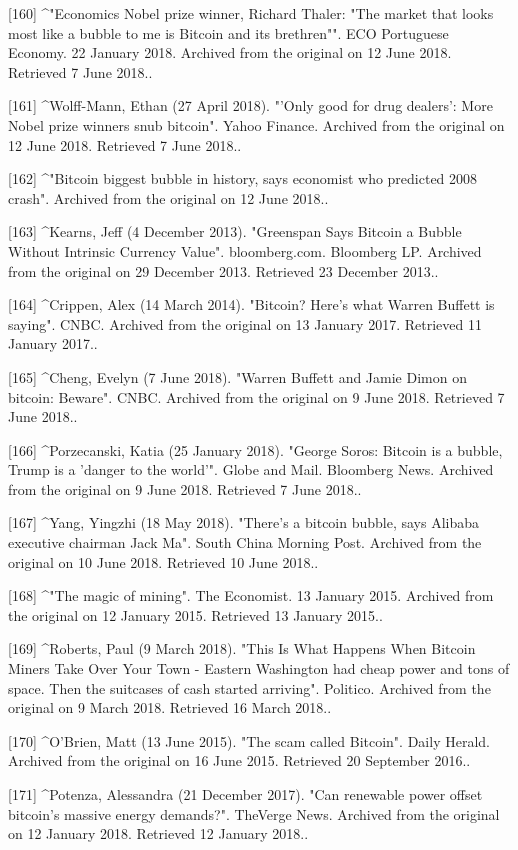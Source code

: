 [160]
^"Economics Nobel prize winner, Richard Thaler: "The market that looks most like a bubble to me is Bitcoin and its brethren"". ECO Portuguese Economy. 22 January 2018. Archived from the original on 12 June 2018. Retrieved 7 June 2018..

[161]
^Wolff-Mann, Ethan (27 April 2018). "'Only good for drug dealers': More Nobel prize winners snub bitcoin". Yahoo Finance. Archived from the original on 12 June 2018. Retrieved 7 June 2018..

[162]
^"Bitcoin biggest bubble in history, says economist who predicted 2008 crash". Archived from the original on 12 June 2018..

[163]
^Kearns, Jeff (4 December 2013). "Greenspan Says Bitcoin a Bubble Without Intrinsic Currency Value". bloomberg.com. Bloomberg LP. Archived from the original on 29 December 2013. Retrieved 23 December 2013..

[164]
^Crippen, Alex (14 March 2014). "Bitcoin? Here's what Warren Buffett is saying". CNBC. Archived from the original on 13 January 2017. Retrieved 11 January 2017..

[165]
^Cheng, Evelyn (7 June 2018). "Warren Buffett and Jamie Dimon on bitcoin: Beware". CNBC. Archived from the original on 9 June 2018. Retrieved 7 June 2018..

[166]
^Porzecanski, Katia (25 January 2018). "George Soros: Bitcoin is a bubble, Trump is a 'danger to the world'". Globe and Mail. Bloomberg News. Archived from the original on 9 June 2018. Retrieved 7 June 2018..

[167]
^Yang, Yingzhi (18 May 2018). "There's a bitcoin bubble, says Alibaba executive chairman Jack Ma". South China Morning Post. Archived from the original on 10 June 2018. Retrieved 10 June 2018..

[168]
^"The magic of mining". The Economist. 13 January 2015. Archived from the original on 12 January 2015. Retrieved 13 January 2015..

[169]
^Roberts, Paul (9 March 2018). "This Is What Happens When Bitcoin Miners Take Over Your Town - Eastern Washington had cheap power and tons of space. Then the suitcases of cash started arriving". Politico. Archived from the original on 9 March 2018. Retrieved 16 March 2018..

[170]
^O'Brien, Matt (13 June 2015). "The scam called Bitcoin". Daily Herald. Archived from the original on 16 June 2015. Retrieved 20 September 2016..

[171]
^Potenza, Alessandra (21 December 2017). "Can renewable power offset bitcoin's massive energy demands?". TheVerge News. Archived from the original on 12 January 2018. Retrieved 12 January 2018..

